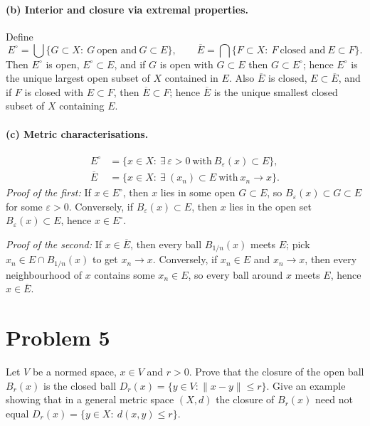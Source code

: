 \documentclass[12pt,a4paper]{article}
\theoremstyle{plain}
\theoremstyle{definition}
\theoremstyle{remark}
\theoremstyle{remark}
\begin{document}
\noindent\hrulefill

\paragraph{(b) Interior and closure via extremal properties.}
Define
\[
E^\circ=\bigcup\{G\subset X:\ G\ \text{open and}\ G\subset E\},\qquad
\overline E=\bigcap\{F\subset X:\ F\ \text{closed and}\ E\subset F\}.
\]
Then $E^\circ$ is open, $E^\circ\subset E$, and if $G$ is open with $G\subset E$ then $G\subset E^\circ$;
hence $E^\circ$ is the unique largest open subset of $X$ contained in $E$.
Also $\overline E$ is closed, $E\subset\overline E$, and if $F$ is closed with $E\subset F$,
then $\overline E\subset F$; hence $\overline E$ is the unique smallest closed subset of $X$
containing $E$.

\noindent\hrulefill

\paragraph{(c) Metric characterisations.}
\begin{align*}
	E^\circ&=\{x\in X:\ \exists\,\varepsilon>0\ \text{with}\ B_\varepsilon(x)\subset E\},\\
	\overline E&=\{x\in X:\ \exists\ (x_n)\subset E\ \text{with}\ x_n\to x\}.
\end{align*}
\emph{Proof of the first:} If $x\in E^\circ$, then $x$ lies in some open $G\subset E$, so
$B_\varepsilon(x)\subset G\subset E$ for some $\varepsilon>0$.
Conversely, if $B_\varepsilon(x)\subset E$, then $x$ lies in the open set $B_\varepsilon(x)\subset E$,
hence $x\in E^\circ$.

\emph{Proof of the second:} If $x\in\overline E$, then every ball $B_{1/n}(x)$ meets $E$; pick
$x_n\in E\cap B_{1/n}(x)$ to get $x_n\to x$. Conversely, if $x_n\in E$ and $x_n\to x$, then every
neighbourhood of $x$ contains some $x_n\in E$, so every ball around $x$ meets $E$, hence
$x\in\overline E$.

\section*{Problem 5}
Let $V$ be a normed space, $x\in V$ and $r>0$. Prove that the closure of the open ball
$B_r(x)$ is the closed ball $D_r(x)=\{y\in V:\|x-y\|\le r\}$.
Give an example showing that in a general metric space $(X,d)$ the closure of $B_r(x)$
need not equal $D_r(x)=\{y\in X:\ d(x,y)\le r\}$.
\end{document}
